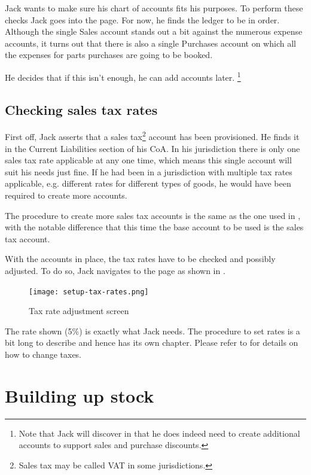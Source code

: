 Jack wants to make sure his chart of accounts fits his purposes. To perform these
checks Jack goes into the  page. For now, he finds
the ledger to be in order. Although the single Sales account stands out a bit against
the numerous expense accounts, it turns out that there is also a single Purchases
account on which all the expenses for parts purchases are going to be booked.

He decides that if this isn't enough, he can add accounts later.
\footnote{Note that Jack will discover in  that
he does indeed need to create additional accounts to support sales and
purchase discounts.}


\section{Checking sales tax rates}
\label{sec-first-login-checking-tax-rates}

First off, Jack asserts that a sales tax\footnote{Sales tax may be called \gls{VAT}
in some jurisdictions.} account has been provisioned. He finds it
in the Current Liabilities section of his \gls{CoA}. In his jurisdiction there
is only one sales tax rate applicable at any one time, which means this single account
will suit his needs just fine. If he had been in a jurisdiction with multiple tax rates
applicable, e.g. different rates for different types of goods, he would have been
required to create more accounts.

The procedure to create more sales tax accounts is the same as the one used in
, with the notable difference that this time the base account
to be used is the sales tax account.

With the accounts in place, the tax rates have to be checked and possibly adjusted.
To do so, Jack navigates to the  page as shown in .

\begin{figure}[h]
\texttt{[image: setup-tax-rates.png]}
\caption{Tax rate adjustment screen}
\label{fig:setup-tax-rates}
\end{figure}

The rate shown (5\%) is exactly what Jack needs. The procedure to set rates is a bit
long to describe and hence has its own chapter. Please refer to  for
details on how to change taxes.

\chapter{Building up stock}
\label{cha-building-up-stock}

